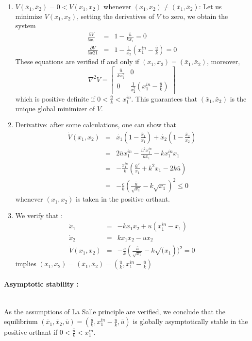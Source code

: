 \begin{enumerate}
\item $V(\bar{x}_1,\bar{x}_2)=0<V(x_1,x_2)$ whenever $(x_1,x_2)\neq (\bar{x}_1,\bar{x}_2)$:
Let us minimize $V(x_1,x_2)$, setting the derivatives of $V$ to zero, we obtain the system
$$
\begin{array}{rcl}
\frac{\partial V}{\partial x_1} &=& 1-\frac{\bar{u}}{kx_1}=0\\
\frac{\partial V}{\partial x21} &=& 1-\frac{1}{x_2}(x_1^{in}-\frac{\bar{u}}{k})=0
\end{array}
$$
These equations are verified if and only if $(x_1,x_2)=(\bar{x}_1,\bar{x}_2)$, moreover,
$$
\nabla^2V=\begin{bmatrix}
\frac{\bar{u}}{kx_1^2} & 0\\
0 & \frac{1}{x_2^2}(x_1^{in}-\frac{\bar{u}}{k})
\end{bmatrix}
$$
which is positive definite if $0<\frac{\bar{u}}{k}<x_1^{in}$. This guarantees that $(\bar{x}_1,\bar{x}_2)$ is the unique global minimizer of $V$.

\item Derivative: after some calculations, one can show that
$$
\begin{array}{rcl}
\dot{V}(x_1,x_2) &=& \dot{x_1}(1-\frac{\bar{x}_1}{x_1})+\dot{x_2}(1-\frac{\bar{x}_2}{x_2})\\
&=& 2\bar{u}x_1^{in}-\frac{\bar{u}^2x_1^{in}}{kx_1}-kx_1^{in}x_1\\
&=& -\frac{x_1^{in}}{k}(\frac{\bar{u}^2}{x_1}+k^2x_1-2k\bar{u})\\
&=& -\frac{c}{k}(\frac{\bar{u}}{\sqrt{x_1}}-k\sqrt{x_1})^2\leq 0
\end{array}
$$
whenever $(x_1,x_2)$ is taken in the positive orthant.

\item We verify that :
$$
\begin{array}{rcl}
\dot{x}_1&=&-kx_1x_2+u(x_1^{in}-x_1)\\
\dot{x}_2&=&kx_1x_2-ux_2\\
\dot{V}(x_1,x_2) &=& -\frac{c}{k}(\frac{\bar{u}}{\sqrt{x_1}}-k\sqrt(x_1))^2 = 0
\end{array}
$$
implies $(x_1,x_2)=(\bar{x}_1,\bar{x}_2)=(\frac{\bar{u}}{k},x_1^{in}-\frac{\bar{u}}{k})$
\end{enumerate}

\paragraph{Asymptotic stability :}~\\
As the assumptions of La Salle principle are verified, we conclude that the equilibrium $(\bar{x}_1,\bar{x}_2,\bar{u})=(\frac{\bar{u}}{k},x_1^{in}-\frac{\bar{u}}{k},\bar{u})$ is globally asymptotically stable in the positive orthant if $0<\frac{\bar{u}}{k}<x_1^{in}$.

